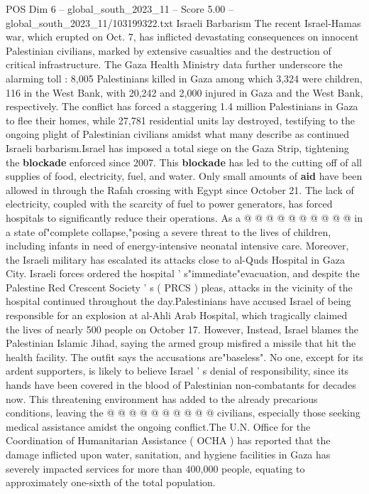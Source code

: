 \begin{textsample}{POS Dim 6 – global\_south\_2023\_11 – Score 5.00 – global\_south\_2023\_11/103199322.txt}  \label{ex:f6_pos_257}
Israeli Barbarism The recent Israel-Hamas war, which erupted on Oct. 7, has inflicted devastating consequences on innocent Palestinian civilians, marked by extensive casualties and the destruction of critical infrastructure.
The Gaza Health Ministry data further underscore the alarming toll : 8,005 Palestinians killed in Gaza among which 3,324 were children, 116 in the West Bank, with 20,242 and 2,000 injured in Gaza and the West Bank, respectively.
The conflict has forced a staggering 1.4 million Palestinians in Gaza to flee their homes, while 27,781 residential units lay destroyed, testifying to the ongoing plight of Palestinian civilians amidst what many describe as continued Israeli barbarism.Israel has imposed a total siege on the Gaza Strip, tightening the \textbf{blockade} enforced since 2007.
This \textbf{blockade} has led to the cutting off of all supplies of food, electricity, fuel, and water.
Only small amounts of \textbf{aid} have been allowed in through the Rafah crossing with Egypt since October 21.
The lack of electricity, coupled with the scarcity of fuel to power generators, has forced hospitals to significantly reduce their operations.
As a @ @ @ @ @ @ @ @ @ @ in a state of"complete collapse,"posing a severe threat to the lives of children, including infants in need of energy-intensive neonatal intensive care.
Moreover, the Israeli military has escalated its attacks close to al-Quds Hospital in Gaza City.
Israeli forces ordered the hospital ' s"immediate"evacuation, and despite the Palestine Red Crescent Society ' s ( PRCS ) pleas, attacks in the vicinity of the hospital continued throughout the day.Palestinians have accused Israel of being responsible for an explosion at al-Ahli Arab Hospital, which tragically claimed the lives of nearly 500 people on October 17.
However, Instead, Israel blames the Palestinian Islamic Jihad, saying the armed group misfired a missile that hit the health facility.
The outfit says the accusations are"baseless".
No one, except for its ardent supporters, is likely to believe Israel ' s denial of responsibility, since its hands have been covered in the blood of Palestinian non-combatants for decades now.
This threatening environment has added to the already precarious conditions, leaving the @ @ @ @ @ @ @ @ @ @ civilians, especially those seeking medical assistance amidst the ongoing conflict.The U.N.
Office for the Coordination of Humanitarian Assistance ( OCHA ) has reported that the damage inflicted upon water, sanitation, and hygiene facilities in Gaza has severely impacted services for more than 400,000 people, equating to approximately one-sixth of the total population.

\end{textsample}

